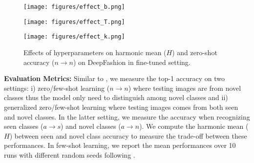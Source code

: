 \documentclass[10pt,journal,compsoc]{IEEEtran}
\newcommand{\1}{\boldsymbol{1}}
\newcommand{\0}{\boldsymbol{0}}
\newcommand{\<}{\langle}
\renewcommand{\>}{\rangle}
\newcommand{\myparagraph}[1]{\vspace{-2pt}\medskip\noindent\textbf{#1}}
\begin{document}
\begin{figure*} 
\centering
\begin{minipage}[b]{0.3\linewidth}
  \texttt{[image: figures/effect\_b.png]}
  \vspace{-1mm}
\end{minipage}
\hspace{2mm}
\begin{minipage}[b]{0.3\linewidth}
  \texttt{[image: figures/effect\_T.png]}
    \vspace{-5mm}
\vspace{4mm}
\end{minipage}
\hspace{2mm}
\begin{minipage}[b]{0.3\linewidth}
  \texttt{[image: figures/effect\_k.png]}
    \vspace{-5mm}
\vspace{4mm}
\end{minipage}
\vspace{-3.5mm}
\caption{\small{Effects of hyperparameters on harmonic mean ($H$) and zero-shot accuracy ($n\rightarrow n$) on DeepFashion in fine-tuned setting.}}
\label{fig:DeepFashion_hyper_params}
\end{figure*}


\myparagraph{Evaluation Metrics:}
Similar to \cite{Xian:PAMI18,Schonfeld:CVPR19}, we measure the top-1 accuracy on two settings: i) zero/few-shot learning ($n\rightarrow n$) where testing images are from novel classes thus the model only need to distinguish among novel classes and ii) generalized zero/few-shot learning where testing images comes from both seen and novel classes. In the latter setting, we measure the accuracy when recognizing seen classes ($a\rightarrow s$) and novel classes ($a\rightarrow n$). We compute the harmonic mean ($H$) between seen and novel class accuracy to measure the trade-off between these performances.
In few-shot learning, we report the mean performances over 10 runs with different random seeds following \cite{Schonfeld:CVPR19}.
\end{document}
